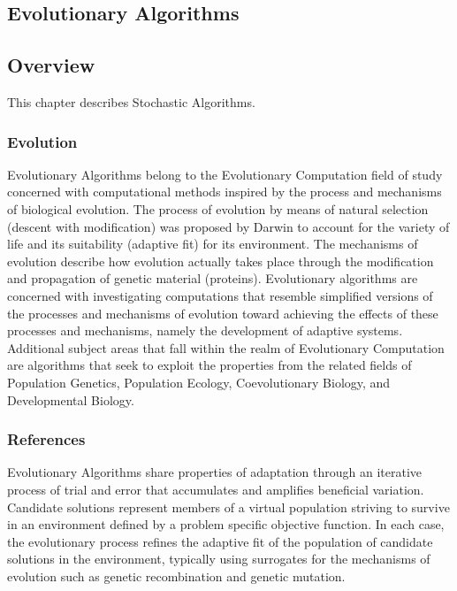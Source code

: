 

\renewcommand{\bibsection}{\subsection{\bibname}}
\begin{bibunit}

\chapter{Evolutionary Algorithms}
\label{ch:evolutionary}

\section{Overview}
This chapter describes Stochastic Algorithms.

\subsection{Evolution}
Evolutionary Algorithms belong to the Evolutionary Computation field of study concerned with computational methods inspired by the process and mechanisms of biological evolution. The process of evolution by means of natural selection (descent with modification) was proposed by Darwin to account for the variety of life and its suitability (adaptive fit) for its environment. The mechanisms of evolution describe how evolution actually takes place through the modification and propagation of genetic material (proteins). Evolutionary algorithms are concerned with investigating computations that resemble simplified versions of the processes and mechanisms of evolution toward achieving the effects of these processes and mechanisms, namely the development of adaptive systems.
Additional subject areas that fall within the realm of Evolutionary Computation are algorithms that seek to exploit the properties from the related fields of Population Genetics, Population Ecology, Coevolutionary Biology, and Developmental Biology. 

\subsection{References}
Evolutionary Algorithms share properties of adaptation through an iterative process of trial and error that accumulates and amplifies beneficial variation. Candidate solutions represent members of a virtual population striving to survive in an environment defined by a problem specific objective function. In each case, the evolutionary process refines the adaptive fit of the population of candidate solutions in the environment, typically using surrogates for the mechanisms of evolution such as genetic recombination and genetic mutation.


\end{bibunit}
